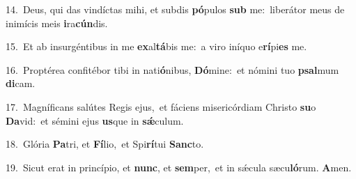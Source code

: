 {\numbfont\textcolor{\numbcolor}{14.}}~Deus, qui das vindíctas mihi, et subdis \textbf{pó}\-pulos \textbf{sub} me:~\star liberátor meus de inimícis meis \textbf{i}\-ra\-\textbf{cún}\-dis.\par
{\numbfont\textcolor{\numbcolor}{15.}}~Et ab insurgéntibus in me \textbf{ex}\-al\-\textbf{tá}\-bis me:~\star a viro iníquo e\-\textbf{rí}\-pi\textbf{es} me.\par
{\numbfont\textcolor{\numbcolor}{16.}}~Proptérea confitébor tibi in nati\-\textbf{ó}\-nibus, \textbf{Dó}\-mine:~\star et nómini tuo \textbf{psal}\-mum \textbf{di}\-cam.\par
{\numbfont\textcolor{\numbcolor}{17.}}~Magníficans salútes Regis ejus,~\dagger et fáciens misericórdiam Christo \textbf{su}\-o \textbf{Da}\-vid:~\star et sémini ejus \textbf{us}\-que in \textbf{sǽ}\-culum.\par
{\numbfont\textcolor{\numbcolor}{18.}}~Glória \textbf{Pa}\-tri, et \textbf{Fí}\-lio,~\star et Spi\-\textbf{rí}\-tui \textbf{Sanc}\-to.\par
{\numbfont\textcolor{\numbcolor}{19.}}~Sicut erat in princípio, et \textbf{nunc}\-, et \textbf{sem}\-per,~\star et in sǽcula sæcu\-\textbf{ló}\-rum. \textbf{A}\-men.\par

